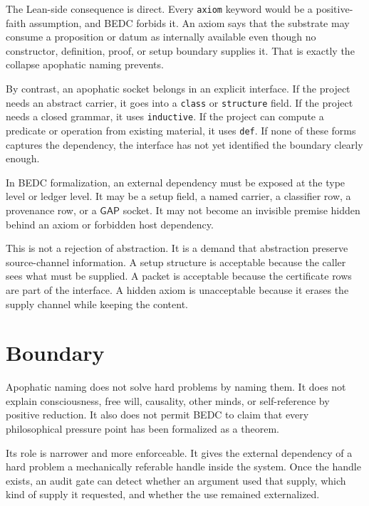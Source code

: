 The Lean-side consequence is direct. Every \texttt{axiom} keyword would be a positive-faith assumption, and BEDC forbids it. An axiom says that the substrate may consume a proposition or datum as internally available even though no constructor, definition, proof, or setup boundary supplies it. That is exactly the collapse apophatic naming prevents.

By contrast, an apophatic socket belongs in an explicit interface. If the project needs an abstract carrier, it goes into a \texttt{class} or \texttt{structure} field. If the project needs a closed grammar, it uses \texttt{inductive}. If the project can compute a predicate or operation from existing material, it uses \texttt{def}. If none of these forms captures the dependency, the interface has not yet identified the boundary clearly enough.

\begin{principle}
\label{prin:apophatic-naming-type-level-exposure}
In BEDC formalization, an external dependency must be exposed at the type level or ledger level. It may be a setup field, a named carrier, a classifier row, a provenance row, or a $\mathsf{GAP}$ socket. It may not become an invisible premise hidden behind an axiom or forbidden host dependency.
\end{principle}

This is not a rejection of abstraction. It is a demand that abstraction preserve source-channel information. A setup structure is acceptable because the caller sees what must be supplied. A \NameCert{} packet is acceptable because the certificate rows are part of the interface. A hidden axiom is unacceptable because it erases the supply channel while keeping the content.

\section{Boundary}
\label{sec:apophatic-naming-boundary}

Apophatic naming does not solve hard problems by naming them. It does not explain consciousness, free will, causality, other minds, or self-reference by positive reduction. It also does not permit BEDC to claim that every philosophical pressure point has been formalized as a theorem.

Its role is narrower and more enforceable. It gives the external dependency of a hard problem a mechanically referable handle inside the system. Once the handle exists, an audit gate can detect whether an argument used that supply, which kind of supply it requested, and whether the use remained externalized.

